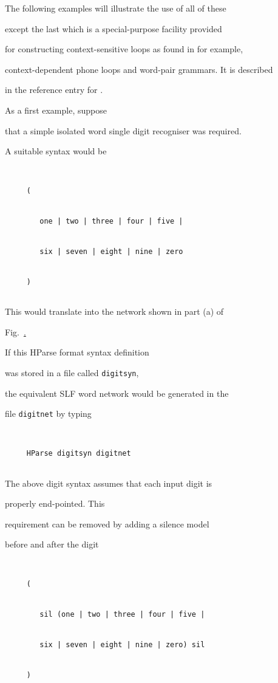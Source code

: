 The following examples will illustrate the use of all of these


except the last which is a special-purpose facility provided


for constructing context-sensitive loops as found in for example,


context-dependent phone loops and word-pair grammars.  It is described


in the reference entry for .





As a first example, suppose


that a simple isolated word single digit recogniser was required.


A suitable syntax would be


\begin{verbatim}


     (


        one | two | three | four | five |


        six | seven | eight | nine | zero


     )


\end{verbatim}


This would translate into the network shown in part (a) of


Fig.~\href{f:digitnets}.


If this HParse format syntax definition


was stored in a file called {\tt digitsyn},


the equivalent SLF word network would be generated in the


file \texttt{digitnet} by typing


\begin{verbatim}


     HParse digitsyn digitnet


\end{verbatim}





The above digit syntax assumes that each input digit is


properly end-pointed.  This


requirement can be removed by adding a silence model


before and after the digit


\begin{verbatim}


     (


        sil (one | two | three | four | five |


        six | seven | eight | nine | zero) sil


     )


\end{verbatim}


